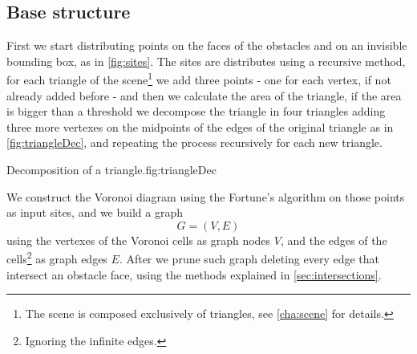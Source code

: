 \documentclass[dissertation.tex]{subfiles}
\begin{document}
\subsection{Base structure}
First we
start distributing points on the faces of the obstacles and on
an invisible bounding box, as in \cref{fig:sites}.
The sites are distributes using a recursive method, for each triangle
of the scene\footnote{The scene is composed exclusively of triangles,
  see \cref{cha:scene} for details.} we add three points - one for each
vertex, if not already added before - and then we calculate the area
of the triangle, if the area is bigger than a threshold we decompose
the triangle in four triangles adding three more vertexes on the
midpoints of the edges of the original triangle as in
\cref{fig:triangleDec}, and repeating the process recursively for
each new triangle.
\begin{myfig}{Decomposition of a triangle.}{fig:triangleDec}
\end{myfig}

We construct the Voronoi diagram using the Fortune's algorithm on
those points as input sites, and we build a graph
$$G=(V,E)$$
using the vertexes
of the Voronoi cells as graph nodes $V$, and the edges of the cells\footnote{Ignoring the
  infinite edges.} as graph edges $E$. After we prune such graph deleting every edge that
intersect an obstacle face, using the methods explained in \cref{sec:intersections}.
\end{document}
